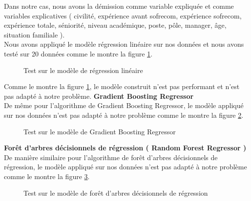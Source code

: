 Dans notre cas, nous avons la démission comme variable expliquée et comme variables explicatives ( civilité, expérience avant sofrecom, expérience sofrecom, expérience totale, séniorité, niveau académique, poste, pôle, manager, âge, situation familiale ).\\
Nous avons appliqué le modèle régression linéaire sur nos données et nous avons testé sur 20 données comme le montre la figure     \ref{fig:LinearRegression}.

   \begin{figure}[htpb]
    \centering
    \caption{Test sur le modèle de régression linéaire}
    \label{fig:LinearRegression}
    \end{figure}
Comme le montre la figure \ref{fig:LinearRegression}, le modèle construit n'est pas performant et n'est pas adapté à notre problème.
\newpage
\textbf{Gradient Boosting Regressor} \\
De même pour l'algorithme de Gradient Boosting Regressor, le modèle appliqué sur nos données n'est pas adapté à notre problème comme le montre la figure     \ref{fig:GBR}.
   \begin{figure}[htpb]
    \centering
    \caption{Test sur le modèle de Gradient Boosting Regressor}
    \label{fig:GBR}
    \end{figure}
    
\textbf{Forêt d'arbres décisionnels de régression ( Random Forest Regressor )} \\
De manière similaire pour l'algorithme de forêt d'arbres décisionnels de régression, le modèle appliqué sur nos données n'est pas adapté à notre problème comme le montre la figure   \ref{fig:RDR}.
   \begin{figure}[htpb]
    \centering
    \caption{Test sur le modèle de forêt d'arbres décisionnels de régression }
    \label{fig:RDR}
    \end{figure}

